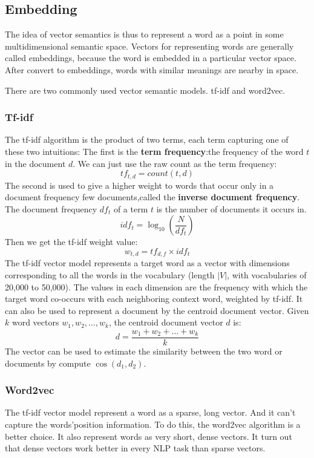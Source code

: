 \subsection{Embedding}
The idea of vector semantics is thus to represent a word as a point in some multidimensional semantic space.
Vectors for representing words are generally called embeddings, because the word is embedded in a particular vector space.
After convert to embeddings, words with similar meanings are nearby in space.

There are two commonly used vector semantic models. tf-idf and word2vec.
\subsubsection{Tf-idf}
The tf-idf algorithm is the product
of two terms, each term capturing one of these two intuitions:
The first is the \textbf{term frequency}:the frequency of the word $t$ in the
document $d$. We can just use the raw count as the term frequency:
\begin{equation}
    tf_{t,d}=count(t,d)
\end{equation}
The second is used to give a higher weight to words that occur only in a
document frequency few documents,called the \textbf{inverse document frequency}. 
The document frequency $df_t$ of a term $t$ is the number of documents it occurs in.
\begin{equation}
    idf_t = \log_{10}{(\frac{N}{df_t})}
\end{equation}
Then we get the tf-idf weight value:
\begin{equation}
    w_{t,d}=tf_{d,f}\times idf_t
\end{equation}
The tf-idf vector model represents a target word as a vector with dimensions 
corresponding to all the words in the vocabulary (length $|V|$, with vocabularies of 20,000 to 50,000).
The values in each dimension are the frequency with which the target 
word co-occurs with each neighboring context word, weighted by tf-idf.
It can also be used to represent a document by the centroid document vector.
Given $k$ word vectors $w_1, w_2, \dots, w_k$, the centroid document vector $d$ is:
\begin{equation}
    d = \frac{w_1+w_2+\dots+w_k}{k}
\end{equation}
The vector can be used to estimate the similarity between the two word or documents by
compute $\cos{(d_1, d_2)}$.

\subsubsection{Word2vec}
The tf-idf vector model represent a word as a sparse, long vector. 
And it can't capture the words'position information. 
To do this, the word2vec algorithm is a better choice.
It also represent words as very short, dense vectors. 
It turn out that dense vectors work better in every NLP task than sparse vectors.

